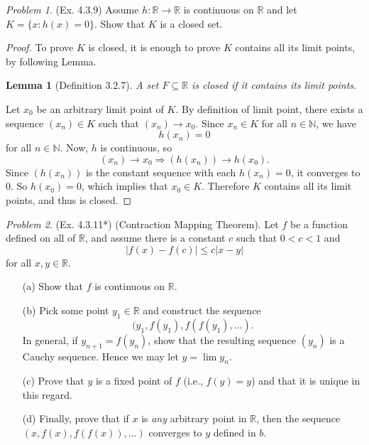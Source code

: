 \documentclass[11pt,twoside, reqno]{amsart}
\newtheorem{Lm}[Thm]{Lemma}
\theoremstyle{remark}
\newtheorem{Prob}{Problem}
\def\R{\mathbb R}
\def\N{\mathbb N}
\renewcommand{\implies}{\Rightarrow}
\begin{document}
\begin{Prob}(Ex. 4.3.9) Assume $h : \R \to \R$ is continuous on $\R$ and let $K = \{x : h(x) = 0\}$. Show that $K$ is a closed set.
\end{Prob}

\begin{proof} To prove $K$ is closed, it is enough to prove $K$ contains all its limit points, by following Lemma.
\begin{Lm} [Definition 3.2.7]
    A set $F \subseteq \R$ is closed if it contains its limit points.
\end{Lm}
Let $x_0$ be an arbitrary limit point of $K$. By definition of limit point, there exists a sequence $(x_n) \in K$ such that $(x_n) \to x_0$. Since $x_n \in K$ for all $n \in \N$, we have
$$
    h(x_n) = 0
$$
for all $n \in \N$. Now, $h$ is continuous, so 
$$
    (x_n) \to x_0 \implies (h(x_n)) \to h(x_0).
$$
Since $(h(x_n))$ is the constant sequence with each $h(x_n) = 0$, it converges to $0$. So $h(x_0) = 0$, which implies that $x_0 \in K$. Therefore $K$ contains all its limit points, and thus is closed.

\end{proof}


\begin{Prob}(Ex. 4.3.11*) (Contraction Mapping Theorem). Let $f$ be a function defined on all of $\R$, and assume there is a constant $c$ such that $0 < c < 1$ and
$$
    |f(x) - f(c)| \leq c|x-y|
$$
for all $x,y \in \R$.
\begin{enumerate}
    \item [(a)] Show that $f$ is continuous on $\R$.
    \item [(b)] Pick some point $y_1 \in \R$ and construct the sequence
    $$
        (y_1,f(y_1), f(f(y_1), \ldots).
    $$
    In general, if $y_{n+1} = f(y_n)$, show that the resulting sequence $(y_n)$ is a Cauchy sequence. Hence we may let $y = \lim y_n$.
    \item [(c)] Prove that $y$ is a fixed point of $f$ (i.e., $f(y) = y$) and that it is unique in this regard.
    \item [(d)] Finally, prove that if $x$ is \textit{any} arbitrary point in $\R$, then the sequence $(x, f(x), f(f(x)),\ldots)$ converges to $y$ defined in $b$.
\end{enumerate}
\end{Prob}
\end{document}
